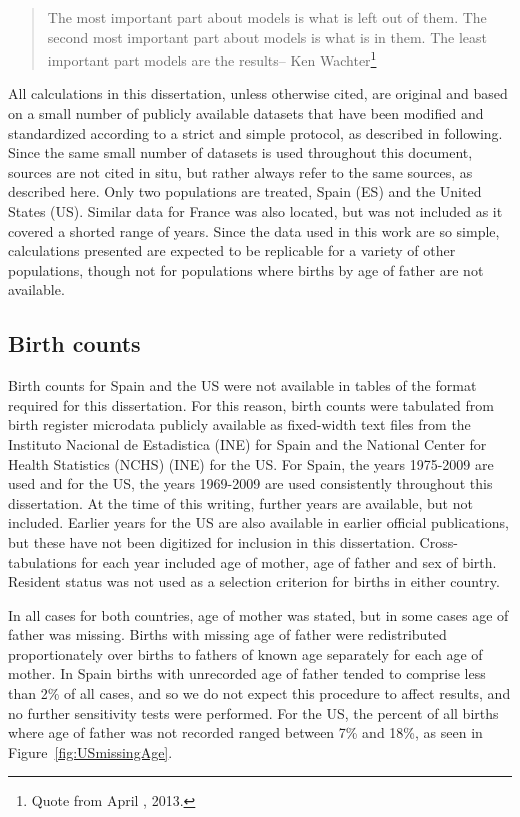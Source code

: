 \begin{singlespace}
\begin{quote}
The most important part about models is what is left out of them. The second
most important part about models is what is in them. The least important part
models are the results-- Ken Wachter\footnote{Quote from April , 2013.}
\end{quote}
\end{singlespace}

All calculations in this dissertation, unless otherwise cited, are original 
and based on a small number of publicly available datasets that have
been modified and standardized according to a strict and simple protocol, as
described in following. Since the same small number of datasets
is used throughout this document, sources are not cited in situ, but rather
always refer to the same sources, as described here. Only two populations are
treated, Spain (ES) and the United States (US). Similar data for France was also
located, but was not included as it covered a shorted range of years. 
Since the data used in this work are so simple, calculations presented are
expected to be replicable for a variety of other populations, though not for
populations where births by age of father are not available.

\subsection{Birth counts}
Birth counts for Spain and the US were not available in tables of the format
required for this dissertation. For this reason, birth counts were tabulated from birth
register microdata publicly available as fixed-width text files from the 
Instituto Nacional de Estadistica (INE)\citep{MNPnacimientos} for Spain and the
National Center for Health Statistics (NCHS) (INE)\citep{NCHS19692009} for the US. For Spain, 
the years 1975-2009 are used and for the US, the years 1969-2009 are used
consistently throughout this dissertation. At the time of this writing, further
years are available, but not included. Earlier years for the US are also
available in earlier official publications, but these have not been digitized
for inclusion in this dissertation. Cross-tabulations for each year included age
of mother, age of father and sex of birth. Resident status was not used as a
selection criterion for births in either country.

In all cases for both countries, age of mother was
stated, but in some cases age of father was missing. Births with missing age of
father were redistributed proportionately over births to fathers of known age 
separately for each age of mother. In Spain births with unrecorded age of father 
tended to comprise less than 2\% of
all cases, and so we do not expect this procedure to affect
results, and no further sensitivity tests were performed. For the US, the
percent of all births where age of father was not recorded ranged between 7\%
and 18\%, as seen in Figure~\ref{fig:USmissingAge}. 

